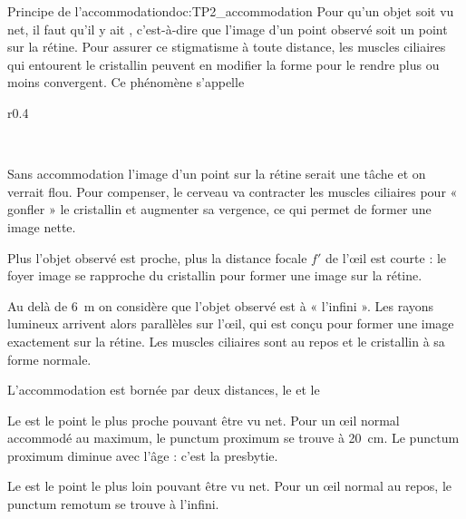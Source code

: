 \begin{doc}{Principe de l'accommodation}{doc:TP2_accommodation}
  Pour qu'un objet soit vu net, il faut qu'il y ait , c'est-à-dire que l'image d'un point observé soit un point sur la rétine.
  Pour assurer ce stigmatisme à toute distance, les muscles ciliaires qui entourent le cristallin peuvent en modifier la forme pour le rendre plus ou moins convergent.
  Ce phénomène s'appelle 

  \begin{wrapfigure}[19]{r}{0.4\linewidth}
    \vspace*{-20pt}
    \centering
     \\
    
     \\
  \end{wrapfigure}

  \pointCyan {}
  
  Sans accommodation l'image d'un point sur la rétine serait une tâche et on verrait flou.
  Pour compenser, le cerveau va contracter les muscles ciliaires pour « gonfler » le cristallin et augmenter sa vergence, ce qui permet de former une image nette.

  Plus l'objet observé est proche, plus la distance focale $f'$ de l'œil est courte : le foyer image se rapproche du cristallin pour former une image sur la rétine.
  
  \pointCyan {}
  
  Au delà de \qty{6}{\m} on considère que l'objet observé est à « l'infini ».
  Les rayons lumineux arrivent alors parallèles sur l'œil, qui est conçu pour former une image exactement sur la rétine.
  Les muscles ciliaires sont au repos et le cristallin à sa forme normale.

  \pointCyan {}
  
  L'accommodation est bornée par deux distances, le  et le 
  \begin{listePoints}
    \item Le  est le point le plus proche pouvant être vu net.
    Pour un œil normal accommodé au maximum, le punctum proximum se trouve à \qty{20}{\cm}.
    Le punctum proximum diminue avec l'âge : c'est la presbytie.
  \end{listePoints}
  
  \begin{listePoints}
    \item Le  est le point le plus loin pouvant être vu net.
    Pour un œil normal au repos, le punctum remotum se trouve à l'infini.
  \end{listePoints}
\end{doc}

